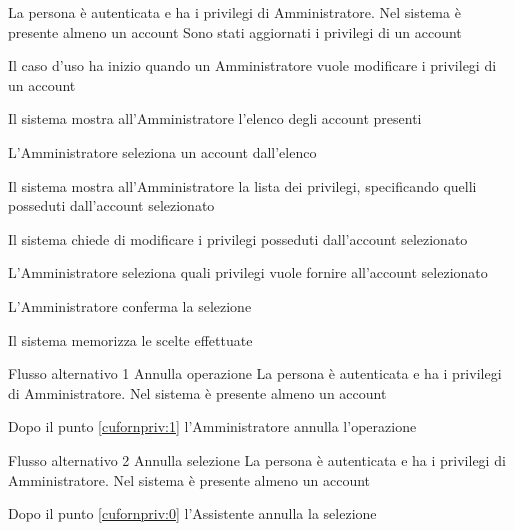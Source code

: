 {}
{La persona è autenticata e ha i privilegi di Amministratore. Nel sistema è presente almeno un account}
{Sono stati aggiornati i privilegi di un account}
{\begin{enumCU}
	\item Il caso d'uso ha inizio quando un Amministratore vuole modificare i privilegi di un account
	\item Il sistema mostra all'Amministratore l'elenco degli account presenti \label{cufornpriv:0}
	\item L'Amministratore seleziona un account dall'elenco
	\item Il sistema mostra all'Amministratore la lista dei privilegi, specificando quelli posseduti dall'account selezionato
	\item Il sistema chiede di modificare i privilegi posseduti dall'account selezionato
	\item L'Amministratore seleziona quali privilegi vuole fornire all'account selezionato \label{cufornpriv:1}
	\item L'Amministratore conferma la selezione
	\item Il sistema memorizza le scelte effettuate
\end{enumCU}}
%
{Flusso alternativo 1}%
{Annulla operazione}%
{La persona è autenticata e ha i privilegi di Amministratore. Nel sistema è presente almeno un account}%
{\postNulle}%
{\begin{enumCU}
		\item Dopo il punto \ref{cufornpriv:1} l'Amministratore annulla l'operazione
	\end{enumCU}}%
%	
{Flusso alternativo 2}%
{Annulla selezione}%
{La persona è autenticata e ha i privilegi di Amministratore. Nel sistema è presente almeno un account}%
{\postNulle}%
{\begin{enumCU}
		\item Dopo il punto \ref{cufornpriv:0} l'Assistente annulla la selezione
\end{enumCU}}%

\tabcuvspace

